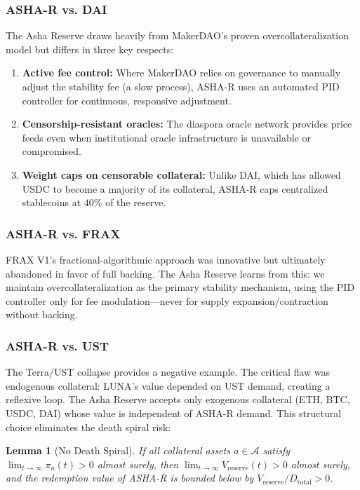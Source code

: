 \documentclass[11pt,a4paper]{article}
\newcommand{\ashares}{\textsc{ASHA-R}\xspace}
\newtheorem{lemma}{Lemma}
\begin{document}
\subsubsection{ASHA-R vs. DAI}

The Asha Reserve draws heavily from MakerDAO's proven overcollateralization model but differs in three key respects:

\begin{enumerate}
  \item \textbf{Active fee control:} Where MakerDAO relies on governance to manually adjust the stability fee (a slow process), \ashares uses an automated PID controller for continuous, responsive adjustment.
  \item \textbf{Censorship-resistant oracles:} The diaspora oracle network provides price feeds even when institutional oracle infrastructure is unavailable or compromised.
  \item \textbf{Weight caps on censorable collateral:} Unlike DAI, which has allowed USDC to become a majority of its collateral, \ashares caps centralized stablecoins at $40\%$ of the reserve.
\end{enumerate}

\subsubsection{ASHA-R vs. FRAX}

FRAX V1's fractional-algorithmic approach was innovative but ultimately abandoned in favor of full backing.
The Asha Reserve learns from this: we maintain overcollateralization as the primary stability mechanism, using the PID controller only for fee modulation---never for supply expansion/contraction without backing.

\subsubsection{ASHA-R vs. UST}

The Terra/UST collapse provides a negative example.
The critical flaw was endogenous collateral: LUNA's value depended on UST demand, creating a reflexive loop.
The Asha Reserve accepts only exogenous collateral (ETH, BTC, USDC, DAI) whose value is independent of \ashares demand.
This structural choice eliminates the death spiral risk:

\begin{lemma}[No Death Spiral]
\label{lemma:no_spiral}
If all collateral assets $a \in \mathcal{A}$ satisfy $\lim_{t \to \infty} \pi_a(t) > 0$ almost surely, then $\lim_{t \to \infty} V_{\text{reserve}}(t) > 0$ almost surely, and the redemption value of \ashares is bounded below by $V_{\text{reserve}} / D_{\text{total}} > 0$.
\end{lemma}
\end{document}
